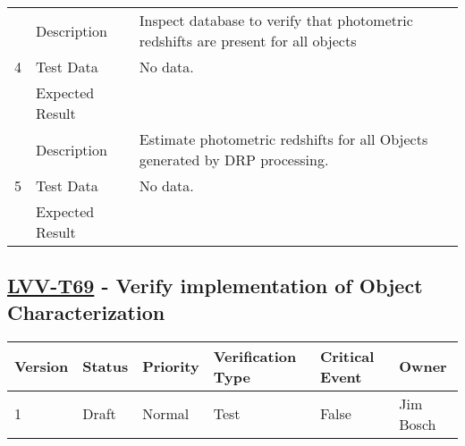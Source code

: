 \begin{longtable}[]{p{1.3cm}p{2cm}p{13cm}}
            \multirow{3}{*}{ 4 } & Description &
            \begin{minipage}[t]{13cm}{\footnotesize
            Inspect database to verify that photometric redshifts are present for
all objects

            \vspace{\dp0}
            } \end{minipage} \\ \cline{2-3}
            & Test Data &
            \begin{minipage}[t]{13cm}{\footnotesize
                No data.
                \vspace{\dp0}
            } \end{minipage} \\ \cline{2-3}
            & Expected Result &
        \\ \midrule

            \multirow{3}{*}{ 5 } & Description &
            \begin{minipage}[t]{13cm}{\footnotesize
            Estimate photometric redshifts for all Objects generated by DRP
processing.

            \vspace{\dp0}
            } \end{minipage} \\ \cline{2-3}
            & Test Data &
            \begin{minipage}[t]{13cm}{\footnotesize
                No data.
                \vspace{\dp0}
            } \end{minipage} \\ \cline{2-3}
            & Expected Result &
        \\ \midrule
    \end{longtable}

\subsection{\href{https://jira.lsstcorp.org/secure/Tests.jspa\#/testCase/LVV-T69}{LVV-T69}
    - Verify implementation of Object Characterization}\label{lvv-t69}

\begin{longtable}[]{llllll}
\toprule
Version & Status & Priority & Verification Type & Critical Event & Owner
\\\midrule
1 & Draft & Normal &
Test & False & Jim Bosch
\\\bottomrule
\end{longtable}

